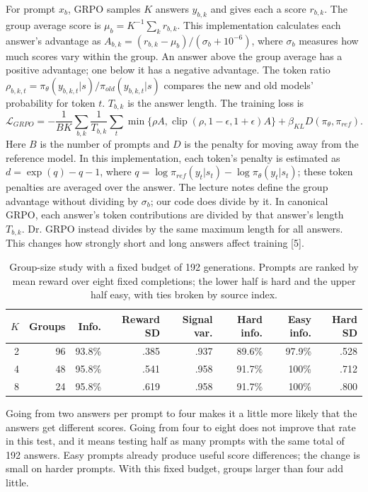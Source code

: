 \documentclass[10pt]{article}
\begin{document}
For prompt $x_b$, GRPO samples $K$ answers $y_{b,k}$ and gives each a score $r_{b,k}$. The group average score is $\mu_b=K^{-1}\sum_k r_{b,k}$. This implementation calculates each answer's advantage as $A_{b,k}=(r_{b,k}-\mu_b)/(\sigma_b+10^{-6})$, where $\sigma_b$ measures how much scores vary within the group. An answer above the group average has a positive advantage; one below it has a negative advantage. The token ratio $\rho_{b,k,t}=\pi_\theta(y_{b,k,t}|s)/\pi_{old}(y_{b,k,t}|s)$ compares the new and old models' probability for token $t$. $T_{b,k}$ is the answer length. The training loss is
\begin{equation}
\mathcal{L}_{GRPO}=-\frac{1}{BK}\sum_{b,k}\frac{1}{T_{b,k}}\sum_t\min\{\rho A,\operatorname{clip}(\rho,1-\epsilon,1+\epsilon)A\}+\beta_{KL}D(\pi_\theta,\pi_{ref}).
\end{equation}
Here $B$ is the number of prompts and $D$ is the penalty for moving away from the reference model. In this implementation, each token's penalty is estimated as $d=\exp(q)-q-1$, where $q=\log\pi_{ref}(y_t|s_t)-\log\pi_\theta(y_t|s_t)$; these token penalties are averaged over the answer. The lecture notes define the group advantage without dividing by $\sigma_b$; our code does divide by it. In canonical GRPO, each answer's token contributions are divided by that answer's length $T_{b,k}$. Dr. GRPO instead divides by the same maximum length for all answers. This changes how strongly short and long answers affect training [5].

\begin{table}[h]
\centering\scriptsize
\caption{Group-size study with a fixed budget of 192 generations. Prompts are ranked by mean reward over eight fixed completions; the lower half is hard and the upper half easy, with ties broken by source index.}
\begin{tabular}{rrrrrrrr}
\toprule
$K$ & Groups & Info. & Reward SD & Signal var. & Hard info. & Easy info. & Hard SD \\
\midrule
2 & 96 & 93.8\% & .385 & .937 & 89.6\% & 97.9\% & .528 \\
4 & 48 & 95.8\% & .541 & .958 & 91.7\% & 100\% & .712 \\
8 & 24 & 95.8\% & .619 & .958 & 91.7\% & 100\% & .800 \\
\bottomrule
\end{tabular}
\end{table}

Going from two answers per prompt to four makes it a little more likely that the answers get different scores. Going from four to eight does not improve that rate in this test, and it means testing half as many prompts with the same total of 192 answers. Easy prompts already produce useful score differences; the change is small on harder prompts. With this fixed budget, groups larger than four add little.
\end{document}
